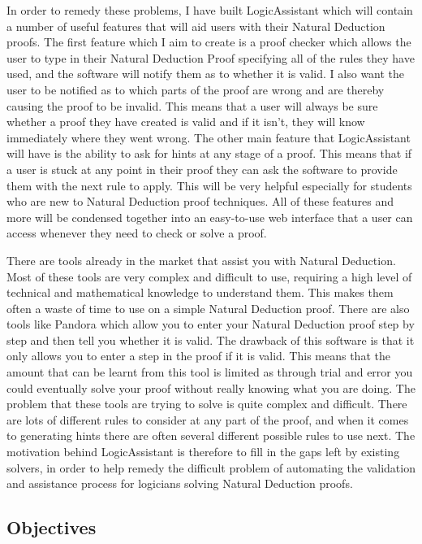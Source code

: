 In order to remedy these problems, I have built LogicAssistant which will contain a number of useful features that will aid users with their Natural Deduction proofs. The first feature which I aim to create is a proof checker which allows the user to type in their Natural Deduction Proof specifying all of the rules they have used, and the software will notify them as to whether it is valid. I also want the user to be notified as to which parts of the proof are wrong and are thereby causing the proof to be invalid. This means that a user will always be sure whether a proof they have created is valid and if it isn't, they will know immediately where they went wrong. The other main feature that LogicAssistant will have is the ability to ask for hints at any stage of a proof. This means that if a user is stuck at any point in their proof they can ask the software to provide them with the next rule to apply. This will be very helpful especially for students who are new to Natural Deduction proof techniques. All of these features and more will be condensed together into an easy-to-use web interface that a user can access whenever they need to check or solve a proof. 

There are tools already in the market that assist you with Natural Deduction. Most of these tools are very complex and difficult to use, requiring a high level of technical and mathematical knowledge to understand them. This makes them often a waste of time to use on a simple Natural Deduction proof. There are also tools like Pandora\cite{pandora} which allow you to enter your Natural Deduction proof step by step and then tell you whether it is valid. The drawback of this software is that it only allows you to enter a step in the proof if it is valid. This means that the amount that can be learnt from this tool is limited as through trial and error you could eventually solve your proof without really knowing what you are doing. The problem that these tools are trying to solve is quite complex and difficult. There are lots of different rules to consider at any part of the proof, and when it comes to generating hints there are often several different possible rules to use next. The motivation behind LogicAssistant is therefore to fill in the gaps left by existing solvers, in order to help remedy the difficult problem of automating the validation and assistance process for logicians solving Natural Deduction proofs.

\subsection{Objectives \label{objectives}}

